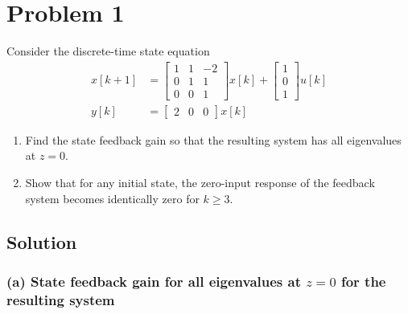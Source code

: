 \section*{Problem 1}

Consider the discrete-time state equation
\begin{align*}
    x[k+1]
     & =
    \begin{bmatrix}
        1 & 1 & -2 \\
        0 & 1 & 1  \\
        0 & 0 & 1
    \end{bmatrix}
    x[k] +
    \begin{bmatrix}
        1 \\
        0 \\
        1
    \end{bmatrix}
    u[k]
    \\
    y[k]
     & =
    \begin{bmatrix}
        2 & 0 & 0
    \end{bmatrix}
    x[k]
\end{align*}
\begin{enumerate}[label= (\alph*)]
    \item Find the state feedback gain so that the resulting system has all eigenvalues at \( z=0 \).
    \item Show that for any initial state, the zero-input response of the feedback system becomes identically zero for \( k \geq 3 \).
\end{enumerate}

\subsection*{Solution}

\subsubsection*{(a) State feedback gain for all eigenvalues at \( z = 0 \) for the resulting system}

